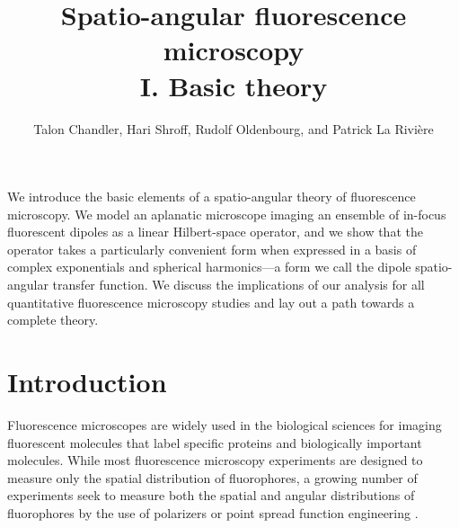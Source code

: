 \documentclass[]{osa-article}
\begin{document}
\title{Spatio-angular fluorescence microscopy\\ I. Basic theory}

\author{Talon Chandler, Hari Shroff, Rudolf Oldenbourg, and Patrick La Rivi\`ere}

\address{University of Chicago, Department of Radiology, Chicago, Illinois 60637, USA\\
  Section on High Resolution Optical Imaging, National Institute
  of Biomedical Imaging and Bioengineering, National Institutes of Health,
  Bethesda, Maryland 20892, USA\\
  Marine Biological Laboratory, Bell Center, Woods Hole, Massachusetts 02543, USA
}




\begin{abstract*}
  We introduce the basic elements of a spatio-angular theory of fluorescence
  microscopy. We model an aplanatic microscope imaging an ensemble of in-focus
  fluorescent dipoles as a linear Hilbert-space operator, and we show that the
  operator takes a particularly convenient form when expressed in a basis of
  complex exponentials and spherical harmonics---a form we call the dipole
  spatio-angular transfer function. We discuss the implications of our analysis
  for all quantitative fluorescence microscopy studies and lay out a path
  towards a complete theory. %
\end{abstract*}

\section{Introduction}
Fluorescence microscopes are widely used in the biological sciences for imaging
fluorescent molecules that label specific proteins and biologically important
molecules. While most fluorescence microscopy experiments are designed to
measure only the spatial distribution of fluorophores, a growing number of
experiments seek to measure both the spatial and angular distributions of
fluorophores by the use of polarizers \cite{vrabioiu2006, mattheyses2010,
  mehta2016, mcquilken2017, zhanghao2017} or point spread function engineering
\cite{agrawal2012, zhang2018}.
\end{document}
